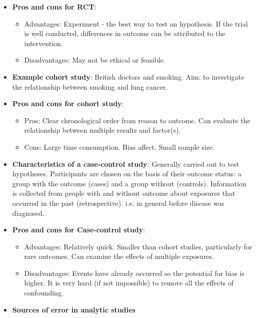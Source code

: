 \documentclass[12pt]{article}
\begin{document}
\begin{itemize}
\item \textbf{Pros and cons for RCT}:
    \begin{itemize}
    \item Advantages: Experiment - the best way to test an hypothesis. If the trial is well conducted, differences in outcome can be attributed to the intervention.
    \item Disadvantages: May not be ethical or feasible.
    \end{itemize}
\item \textbf{Example cohort study}: British doctors and smoking. Aim: to investigate the relationship between smoking and lung cancer.
\item \textbf{Pros and cons for cohort study}:
    \begin{itemize}
    \item Pros: Clear chronological order from reason to outcome. Can evaluate the relationship between multiple results and factor(s).
    \item Cons: Large time consumption. Bias affect. Small sample size.
    \end{itemize}
\item \textbf{Characteristics of a case-control study}: Generally carried out to test hypotheses. Participants are chosen on the basis of their outcome status: a group with the outcome (cases) and a group without (controls). Information is collected from people with and without outcome about exposures that occurred in the past (retrospective). i.e. in general before disease was diagnosed.
\item \textbf{Pros and cons for Case-control study}:
    \begin{itemize}
    \item Advantages: Relatively quick. Smaller than cohort studies, particularly for rare outcomes. Can examine the effects of multiple exposures.
    \item Disadvantages: Events have already occurred so the potential for bias is higher. It is very hard (if not impossible) to remove all the effects of confounding.
    \end{itemize}
\item \textbf{Sources of error in analytic studies}


\end{itemize}
\end{document}
